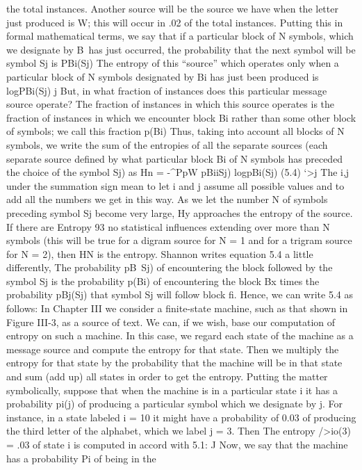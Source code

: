 {the total instances. Another source will be the source we have when
the letter just produced is W; this will occur in .02 of the total
instances.
Putting this in formal mathematical terms, we say that if a
particular block of N symbols, which we designate by B\, has just
occurred, the probability that the next symbol will be symbol Sj is
PBi(Sj)
The entropy of this “source” which operates only when a particular
block of N symbols designated by Bi has just been produced is
logPBi(Sj)
j
But, in what fraction of instances does this particular message
source operate? The fraction of instances in which this source
operates is the fraction of instances in which we encounter block
Bi rather than some other block of symbols; we call this fraction
p(Bi)
Thus, taking into account all blocks of N symbols, we write the
sum of the entropies of all the separate sources (each separate
source defined by what particular block Bi of N symbols has
preceded the choice of the symbol Sj) as
Hn = -^PpW pBiiSj) logpBi(Sj) (5.4)
‘>j
The i,j under the summation sign mean to let i and j assume all
possible values and to add all the numbers we get in this way.
As we let the number N of symbols preceding symbol Sj become
very large, Hy approaches the entropy of the source. If there are
Entropy 93
no statistical influences extending over more than N symbols (this
will be true for a digram source for N = 1 and for a trigram
source for N = 2), then HN is the entropy.
Shannon writes equation 5.4 a little differently, The probability
p{B\, Sj) of encountering the block followed by the symbol Sj
is the probability p(Bi) of encountering the block Bx times the
probability pBj(Sj) that symbol Sj will follow block fi{. Hence, we
can write 5.4 as follows:
In Chapter III we consider a finite-state machine, such as that
shown in Figure III-3, as a source of text. We can, if we wish, base
our computation of entropy on such a machine. In this case, we
regard each state of the machine as a message source and compute
the entropy for that state. Then we multiply the entropy for that
state by the probability that the machine will be in that state and
sum (add up) all states in order to get the entropy.
Putting the matter symbolically, suppose that when the machine
is in a particular state i it has a probability pi(j) of producing a
particular symbol which we designate by j. For instance, in a state
labeled i = 10 it might have a probability of 0.03 of producing the
third letter of the alphabet, which we label j = 3. Then
The entropy />io(3) = .03
of state i is computed in accord with 5.1:
J
Now, we say that the machine has a probability Pi of being in the
}}}
